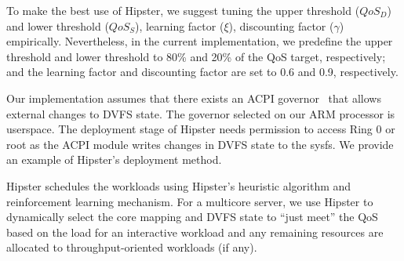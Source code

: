  To make the best use of Hipster, we suggest tuning the upper
 threshold ($QoS_{\mathit{D}}$) and lower  threshold ($QoS_{\mathit{S}}$), learning factor
($\xi$), discounting factor ($\gamma$) empirically. Nevertheless, in the current
implementation, we predefine the upper threshold and lower threshold to  80\% and 20\% of the QoS
target, respectively; and the learning factor and discounting factor are set to 0.6 and
0.9, respectively. 

Our implementation assumes that there exists an ACPI governor~\citep{ondemand} that allows external changes to DVFS state. The governor selected
on our ARM processor is \textsf{userspace}. The deployment stage of Hipster needs
permission to access \textsf{Ring 0} or \textsf{root} as the ACPI module writes
changes in DVFS state to the \textsf{sysfs}. We provide an example of Hipster's deployment method. 

\vspace{1mm}

Hipster schedules the workloads using Hipster's heuristic algorithm and reinforcement
learning mechanism. For a multicore server, we use Hipster to dynamically select the core
mapping and DVFS state to ``just meet'' the QoS based on the load for an interactive
workload and any remaining resources are allocated to throughput-oriented workloads (if
any).
